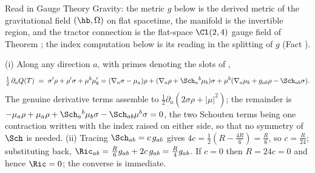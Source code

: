 Read in Gauge Theory Gravity: the metric $g$ below is the derived metric of the gravitational field $(\hb, \Omega)$ on flat spacetime, the manifold is the invertible region, and the tractor connection is the flat-space $\Cl(2,4)$ gauge field of Theorem ; the index computation below is its reading in the splitting of $g$ (Fact ).

(i) Along any direction $a$, with primes denoting the slots of ,
\[
\tfrac12\,\partial_a Q(T) \;=\; \sigma'\rho + \rho'\sigma + \mu^b\mu'_b
= (\nabla_a\sigma - \mu_a)\rho + (\nabla_a\rho + \Sch_a{}^b\mu_b)\sigma + \mu^b(\nabla_a\mu_b + g_{ab}\rho - \Sch_{ab}\sigma).
\]
The genuine derivative terms assemble to $\tfrac12\partial_a(2\sigma\rho + |\mu|^2)$; the remainder is $-\mu_a\rho + \mu_a \rho + \Sch_a{}^b\mu_b\sigma - \Sch_{ab}\mu^b\sigma = 0$, the two Schouten terms being one contraction written with the index raised on either side, so that no symmetry of $\Sch$ is needed.
(ii) Tracing $\Sch_{ab} = c\,g_{ab}$ gives $4c = \tfrac12(R - \tfrac{4R}{6}) = \tfrac{R}{6}$, so $c = \tfrac{R}{24}$; substituting back, $\Ric_{ab} = \tfrac{R}{6}g_{ab} + 2c\,g_{ab} = \tfrac{R}{4}g_{ab}$. If $c = 0$ then $R = 24c = 0$ and hence $\Ric = 0$; the converse is immediate.
